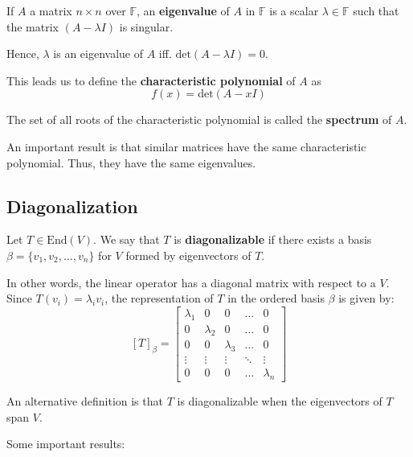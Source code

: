 \begin{definition}
	If $A$ a matrix $n \times n$ over $\mathbb{F}$, an \textbf{eigenvalue} of $A$ in $\mathbb{F}$ is a scalar $\lambda \in \mathbb{F}$ such that the matrix $(A - \lambda I)$ is singular.
\end{definition}

Hence, $\lambda$ is an eigenvalue of $A$ iff. $\text{det}(A-\lambda I) = 0$.

\begin{definition}
	This leads us to define the \textbf{characteristic polynomial} of $A$ as \[ f(x) = \text{det}(A-xI) \]

	The set of all roots of the characteristic polynomial is called the \textbf{spectrum} of $A$.
\end{definition}

An important result is that similar matrices have the same characteristic polynomial. Thus, they have the same eigenvalues.

\subsection{Diagonalization}

\begin{definition}[Diagonalization]
	Let $T \in \text{End}(V)$. We say that $T$ is \textbf{diagonalizable} if there exists a basis $\beta = \{ v_1, v_2, \ldots, v_n \}$ for $V$ formed by eigenvectors of $T$.
\end{definition}

In other words, the linear operator has a diagonal matrix with respect to a $V$. Since $T(v_i) = \lambda_i v_i$, the representation of $T$ in the ordered basis $\beta$ is given by:
\[
	[T]_{\beta} = \begin{bmatrix}
	\lambda_1 & 0 & 0 & \ldots & 0 \\
	0 & \lambda_2 & 0 & \ldots & 0 \\
	0 & 0 & \lambda_3 & \ldots & 0 \\
	\vdots & \vdots & \vdots & \ddots & \vdots \\
	0 & 0 & 0 & \ldots & \lambda_n
	\end{bmatrix}
\]

An alternative definition is that $T$ is diagonalizable when the eigenvectors of $T$ span $V$.

Some important results:

